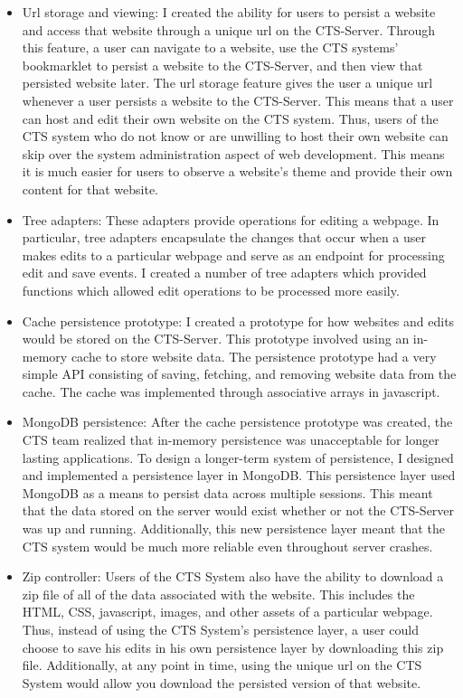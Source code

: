 \documentclass[12pt]{article}
\begin{document}
\begin{itemize}
  \item Url storage and viewing: I created the ability for users to persist a website and access that website through a unique url on the CTS-Server. Through this feature, a user can navigate to a website, use the CTS systems' bookmarklet to persist a website to the CTS-Server, and then view that persisted website later. The url storage feature gives the user a unique url whenever a user persists a website to the CTS-Server. This means that a user can host and edit their own website on the CTS system. Thus, users of the CTS system who do not know or are unwilling to host their own website can skip over the system administration aspect of web development. This means it is much easier for users to observe a website's theme and provide their own content for that website.
  \item Tree adapters: These adapters provide operations for editing a webpage. In particular, tree adapters encapsulate the changes that occur when a user makes edits to a particular webpage and serve as an endpoint for processing edit and save events. I created a number of tree adapters which provided functions which allowed edit operations to be processed more easily.
  \item Cache persistence prototype: I created a prototype for how websites and edits would be stored on the CTS-Server. This prototype involved using an in-memory cache to store website data. The persistence prototype had a very simple API consisting of saving, fetching, and removing website data from the cache. The cache was implemented through associative arrays in javascript.
  \item MongoDB persistence: After the cache persistence prototype was created, the CTS team realized that in-memory persistence was unacceptable for longer lasting applications. To design a longer-term system of persistence, I designed and implemented a persistence layer in MongoDB. This persistence layer used MongoDB as a means to persist data across multiple sessions. This meant that the data stored on the server would exist whether or not the CTS-Server was up and running. Additionally, this new persistence layer meant that the CTS system would be much more reliable even throughout server crashes.
  \item Zip controller: Users of the CTS System also have the ability to download a zip file of all of the data associated with the website. This includes the HTML, CSS, javascript, images, and other assets of a particular webpage. Thus, instead of using the CTS System's persistence layer, a user could choose to save his edits in his own persistence layer by downloading this zip file. Additionally, at any point in time, using the unique url on the CTS System would allow you download the persisted version of that website.

\end{itemize}
\end{document}
